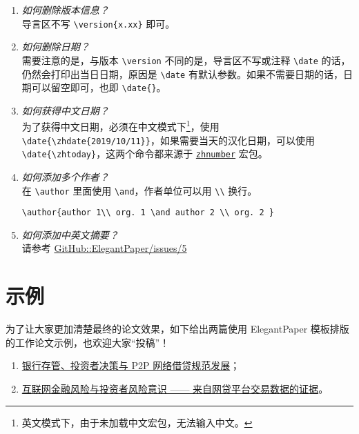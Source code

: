 \documentclass[lang=cn,11pt,a4paper,cite=authoryear]{elegantpaper}
\begin{document}
\begin{enumerate}[label=\arabic*).]
  \item \textit{如何删除版本信息？}\\
      导言区不写 \lstinline|\version{x.xx}| 即可。
  \item \textit{如何删除日期？}\\
      需要注意的是，与版本 \lstinline{\version} 不同的是，导言区不写或注释 \lstinline{\date} 的话，仍然会打印出当日日期，原因是 \lstinline{\date} 有默认参数。如果不需要日期的话，日期可以留空即可，也即 \lstinline|\date{}|。
  \item \textit{如何获得中文日期？}\\
      为了获得中文日期，必须在中文模式下\footnote{英文模式下，由于未加载中文宏包，无法输入中文。}，使用 \lstinline|\date{\zhdate{2019/10/11}}|，如果需要当天的汉化日期，可以使用 \lstinline|\date{\zhtoday}|，这两个命令都来源于 \href{https://ctan.org/pkg/zhnumber}{\lstinline{zhnumber}} 宏包。
  \item \textit{如何添加多个作者？}\\
      在 \lstinline{\author} 里面使用 \lstinline{\and}，作者单位可以用 \lstinline{\\} 换行。\begin{lstlisting}
\author{author 1\\ org. 1 \and author 2 \\ org. 2 }
\end{lstlisting}
  \item \textit{如何添加中英文摘要？}\\
      请参考 \href{https://github.com/ElegantLaTeX/ElegantPaper/issues/5}{GitHub::ElegantPaper/issues/5}
\end{enumerate}

\section{示例}

为了让大家更加清楚最终的论文效果，如下给出两篇使用 ElegantPaper 模板排版的工作论文示例，也欢迎大家“投稿”！

\begin{enumerate}
  \item \href{https://github.com/EthanDeng/bank-custody}{银行存管、投资者决策与 P2P 网络借贷规范发展}；
  \item \href{https://github.com/EthanDeng/risk-awareness}{互联网金融风险与投资者风险意识 —— 来自网贷平台交易数据的证据}。
\end{enumerate}
\end{document}

